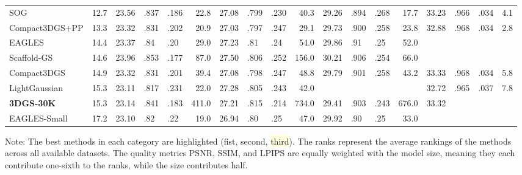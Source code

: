 {\begin{minipage}{\textheight}
\begin{adjustbox}{center}
\begin{tabular}{ll|lllr|lllr|lllr|lllr}
SOG & 12.7 & 23.56 & .837 & .186 & 22.8 & 27.08 & .799 & .230 & 40.3 & 29.26 & .894 & .268 & 17.7 & 33.23 & \cellcolor{lightyellow}.966 & \cellcolor{lightorange}.034 & 4.1 \\
Compact3DGS+PP & 13.3 & 23.32 & .831 & .202 & 20.9 & 27.03 & .797 & .247 & 29.1 & 29.73 & .900 & .258 & 23.8 & 32.88 & \cellcolor{lightred}.968 & \cellcolor{lightorange}.034 & 2.8 \\
EAGLES & 14.4 & 23.37 & .84 & .20 & 29.0 & 27.23 & \cellcolor{lightyellow}.81 & .24 & 54.0 & 29.86 & \cellcolor{lightred}.91 & \cellcolor{lightyellow}.25 & 52.0 &  &  &  &  \\
Scaffold-GS & 14.6 & 23.96 & \cellcolor{lightyellow}.853 & \cellcolor{lightyellow}.177 & 87.0 & 27.50 & .806 & .252 & 156.0 & \cellcolor{lightyellow}30.21 & .906 & .254 & 66.0 &  &  &  &  \\
Compact3DGS & 14.9 & 23.32 & .831 & .201 & 39.4 & 27.08 & .798 & .247 & 48.8 & 29.79 & .901 & .258 & 43.2 & \cellcolor{lightorange}33.33 & \cellcolor{lightred}.968 & \cellcolor{lightorange}.034 & 5.8 \\
LightGaussian & 15.3 & 23.11 & .817 & .231 & 22.0 & 27.28 & .805 & .243 & 42.0 &  &  &  &  & 32.72 & .965 & .037 & 7.8 \\
\textbf{3DGS-30K} & 15.3 & 23.14 & .841 & .183 & 411.0 & 27.21 & \cellcolor{lightred}.815 & \cellcolor{lightred}.214 & 734.0 & 29.41 & .903 & \cellcolor{lightred}.243 & 676.0 & \cellcolor{lightyellow}33.32 &  &  &  \\
EAGLES-Small & 17.2 & 23.10 & .82 & .22 & 19.0 & 26.94 & .80 & .25 & 47.0 & 29.92 & .90 & \cellcolor{lightyellow}.25 & 33.0 &  &  &  &  \\
\bottomrule
\end{tabular}
        \end{adjustbox}
        \newline\newline
        \noindent Note: The best methods in each category are highlighted (\colorbox{lightred}{fist}, \colorbox{lightorange}{second}, \colorbox{lightyellow}{third}). The ranks represent the average rankings of the methods across all available datasets. The quality metrics PSNR, SSIM, and LPIPS are equally weighted with the model size, meaning they each contribute one-sixth to the ranks, while the size contributes half.

    \end{minipage}
}